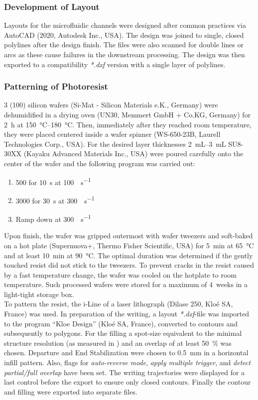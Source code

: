 \subsubsection{Development of Layout}
Layouts for the microfluidic channels were designed after common practices via AutoCAD (2020, Autodesk Inc., USA). The design was joined to single, closed polylines after the design finish. The files were also scanned for double lines or arcs as these cause failures in the downstream processing. The design was then exported to a compatibility \textit{*.dxf} version with a single layer of polylines.
\subsubsection{Patterning of Photoresist}
\SI{3}{\inch} (100) silicon wafers (Si-Mat - Silicon Materials e.K., Germany) were dehumidified in a drying oven (UN30, Memmert GmbH + Co.KG, Germany) for \SI{2}{\hour} at \SIrange{150}{180}{\degreeCelsius}. Then, immediately after they reached room temperature, they were placed centered inside a wafer spinner (WS-650-23B, Laurell Technologies Corp., USA). For the desired layer thicknesses \SIrange{2}{3}{\milli\liter} SU8-30XX (Kayaku Advanced Materials Inc., USA) were poured carefully onto the center of the wafer and the following program was carried out:
\begin{enumerate}[noitemsep]
\item \SI{500}{\rpm} for \SI{10}{s} at \SI{100}{\rpm\per\second}
\item \SI{3000}{\rpm} for \SI{30}{s} at \SI{300}{\rpm\per\second}
\item Ramp down at \SI{300}{\rpm\per\second}
\end{enumerate}
Upon finish, the wafer was gripped outermost with wafer tweezers and soft-baked on a hot plate (Supernuova+, Thermo Fisher Scientific, USA) for \SI{5}{\minute} at \SI{65}{\degreeCelsius} and at least \SI{10}{\minute} at \SI{90}{\degreeCelsius}. The optimal duration was determined if the gently touched resist did not stick to the tweezers. To prevent cracks in the resist caused by a fast temperature change, the wafer was cooled on the hotplate to room temperature. Such processed wafers were stored for a maximum of \SI{4}{weeks} in a light-tight storage box.\\
To pattern the resist, the i-Line of a laser lithograph (Dilase 250, Klo\'{e} SA, France) was used. In preparation of the writing, a layout \textit{*.dxf}-file  was imported to the program ``Kloe Design'' (Klo\'{e} SA, France), converted to contours and subsequently to polygons. For the filling a spot-size equivalent to the minimal structure resolution (as measured in \citet{lit:tech:rojda2020}) and an overlap of at least \SI{50}{\percent} was chosen. Departure and End Stabilization were chosen to \SI{.5}{\milli\meter} in a horizontal infill pattern. Also, flags for \textit{auto-reverse mode}, \textit{apply multiple trigger}, and \textit{detect partial/full overlap} have been set.  The writing trajectories were displayed for a last control before the export to ensure only closed contours. Finally the contour and filling were exported into separate files.\\
